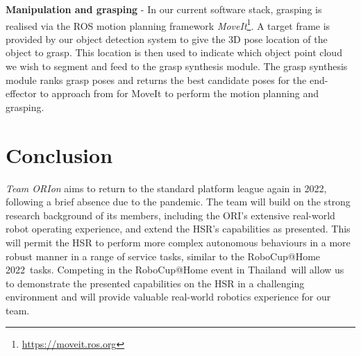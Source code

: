 \documentclass[runningheads,a4paper]{llncs}
\newcommand{\robospecs}{%
  \newpage%
  \pagenumbering{gobble}%
}
\newcommand{\teamori}{Team ORIon}
\newcommand{\competitionyear}{2022}
\newcommand{\competitioncountry}{Thailand}
\begin{document}
\textbf{Manipulation and grasping} - In our current software stack, grasping is realised via the ROS motion planning framework \textit{MoveIt}\footnote{\url{https://moveit.ros.org}}. A target frame is provided by our object detection system to give the 3D pose location of the object to grasp. This location is then used to indicate which object point cloud we wish to segment and feed to the grasp synthesis module. The grasp synthesis module ranks grasp poses and returns the best candidate poses for the end-effector to approach from for MoveIt to perform the motion planning and grasping. 


\section{Conclusion}
\textit{\teamori{}} aims to return to the standard platform league again in \competitionyear, following a brief absence due to the pandemic. The team will build on the strong research background of its members, including the ORI's extensive real-world robot operating experience, and extend the HSR's capabilities as presented. This will permit the HSR to perform more complex autonomous behaviours in a more robust manner in a range of service tasks, similar to the RoboCup@Home \competitionyear\ tasks. 
Competing in the RoboCup@Home event in \competitioncountry\ will allow us to demonstrate the presented capabilities on the HSR in a challenging environment and will provide valuable real-world robotics experience for our team.





\robospecs

\end{document}

